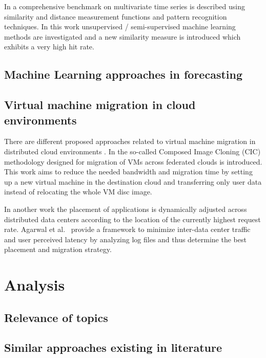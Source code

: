 In \cite{lin2012pattern} a comprehensive benchmark on multivariate time series is described using similarity and distance measurement functions and pattern recognition techniques. In this work unsupervised / semi-supervised machine learning methods are investigated and a new similarity measure is introduced which exhibits a very high hit rate. 

\subsection{Machine Learning approaches in forecasting}

\subsection{Virtual machine migration in cloud environments}

There are different proposed approaches related to virtual machine migration in distributed cloud environments \cite{celesti2010improving, malet2010resource}. In \cite{celesti2010improving} the so-called Composed Image Cloning (CIC) methodology designed for migration of VMs across federated clouds is introduced. This work aims to reduce the needed bandwidth and migration time by setting up a new virtual machine in the destination cloud and transferring only user data instead of relocating the whole VM disc image. 

In another work \cite{malet2010resource} the placement of applications is dynamically adjusted across distributed data centers according to the location of the currently highest request rate. Agarwal et al.~\cite{agarwal2010volley} provide a framework to minimize inter-data center traffic and user perceived latency by analyzing log files and thus determine the best placement and migration strategy. 



\section{Analysis}

\subsection{Relevance of topics}

\subsection{Similar approaches existing in literature}

